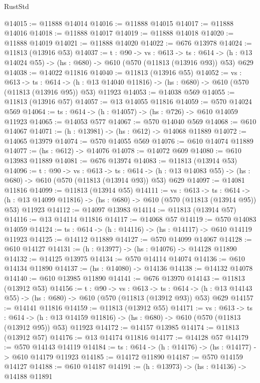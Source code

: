\begin{lexlean}{RustStd}
\begin{coremodule}
@14015 := @11888 @14014
@14016 := @11888 @14015
@14017 := @11888 @14016
@14018 := @11888 @14017
@14019 := @11888 @14018
@14020 := @11888 @14019
@14021 := @11888 @14020
@14022 := @676 @13978
@14024 := @11813 (@13916 @53)
@14037 := {t : @90} ->
  {vs : @613} ->
  {ts : @614} -> (h : @13 @14024 @55) -> (hs : @680) -> @610 (@570 (@11813 (@13916 @93)) @53) @629
@14038 := @14022 @11816
@14040 := @11813 (@13916 @55)
@14052 := {vs : @613} ->
  {ts : @614} ->
  (h : @13 @14040 @11816) -> (hs : @680) -> @610 (@570 (@11813 (@13916 @95)) @53) @11923
@14053 := @14038 @569
@14055 := @11813 (@13916 @57)
@14057 := @13 @14055 @11816
@14059 := @570 @14024 @569
@14064 := {ts : @614} -> (h : @14057) -> (hs : @726) -> @610 @14059 @11923
@14065 := @14053 @577
@14067 := @570 @14040 @569
@14068 := @610 @14067
@14071 := (h : @13981) -> (hs : @612) -> @14068 @11889
@14072 := @14065 @13979
@14074 := @570 @14055 @569
@14076 := @610 @14074 @11889
@14077 := (hs : @612) -> @14076
@14078 := @14072 @609
@14080 := @610 @13983 @11889
@14081 := @676 @13974
@14083 := @11813 (@13914 @53)
@14096 := {t : @90} ->
  {vs : @613} ->
  {ts : @614} -> (h : @13 @14083 @55) -> (hs : @680) -> @610 (@570 (@11813 (@13914 @93)) @53) @629
@14097 := @14081 @11816
@14099 := @11813 (@13914 @55)
@14111 := {vs : @613} ->
  {ts : @614} ->
  (h : @13 @14099 @11816) -> (hs : @680) -> @610 (@570 (@11813 (@13914 @95)) @53) @11923
@14112 := @14097 @13983
@14114 := @11813 (@13914 @57)
@14116 := @13 @14114 @11816
@14117 := @14068 @57
@14119 := @570 @14083 @14059
@14124 := {ts : @614} -> (h : @14116) -> (hs : @14117) -> @610 @14119 @11923
@14125 := @14112 @11889
@14127 := @570 @14099 @14067
@14128 := @610 @14127
@14131 := (h : @13977) -> (hs : @14076) -> @14128 @11890
@14132 := @14125 @13975
@14134 := @570 @14114 @14074
@14136 := @610 @14134 @11890
@14137 := (hs : @14080) -> @14136
@14138 := @14132 @14078
@14140 := @610 @13985 @11890
@14141 := @676 @13970
@14143 := @11813 (@13912 @53)
@14156 := {t : @90} ->
  {vs : @613} ->
  {ts : @614} -> (h : @13 @14143 @55) -> (hs : @680) -> @610 (@570 (@11813 (@13912 @93)) @53) @629
@14157 := @14141 @11816
@14159 := @11813 (@13912 @55)
@14171 := {vs : @613} ->
  {ts : @614} ->
  (h : @13 @14159 @11816) -> (hs : @680) -> @610 (@570 (@11813 (@13912 @95)) @53) @11923
@14172 := @14157 @13985
@14174 := @11813 (@13912 @57)
@14176 := @13 @14174 @11816
@14177 := @14128 @57
@14179 := @570 @14143 @14119
@14184 := {ts : @614} -> (h : @14176) -> (hs : @14177) -> @610 @14179 @11923
@14185 := @14172 @11890
@14187 := @570 @14159 @14127
@14188 := @610 @14187
@14191 := (h : @13973) -> (hs : @14136) -> @14188 @11891

\end{coremodule}
\end{lexlean}
